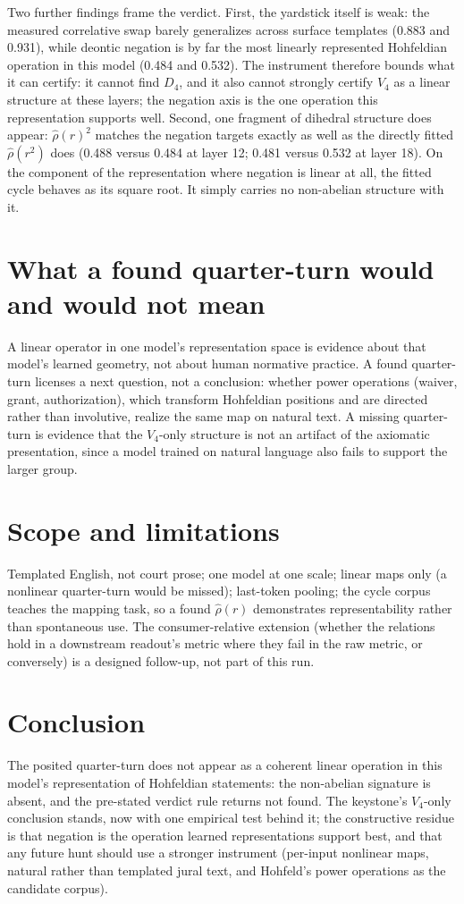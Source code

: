 \documentclass[11pt]{article}
\begin{document}
Two further findings frame the verdict. First, the yardstick itself is weak: the
measured correlative swap barely generalizes across surface templates (0.883 and 0.931),
while deontic negation is by far the most linearly represented Hohfeldian operation in
this model (0.484 and 0.532). The instrument therefore bounds what it can certify: it
cannot find $D_4$, and it also cannot strongly certify $V_4$ as a linear structure at
these layers; the negation axis is the one operation this representation supports well.
Second, one fragment of dihedral structure does appear: $\hat\rho(r)^2$ matches the
negation targets exactly as well as the directly fitted $\hat\rho(r^2)$ does (0.488
versus 0.484 at layer 12; 0.481 versus 0.532 at layer 18). On the component of the
representation where negation is linear at all, the fitted cycle behaves as its square
root. It simply carries no non-abelian structure with it.

\section{What a found quarter-turn would and would not mean}
A linear operator in one model's representation space is evidence about that model's learned
geometry, not about human normative practice. A found quarter-turn licenses a next
question, not a conclusion: whether power operations (waiver, grant, authorization), which
transform Hohfeldian positions and are directed rather than involutive, realize the same map
on natural text. A missing quarter-turn is evidence that the $V_4$-only structure is not an
artifact of the axiomatic presentation, since a model trained on natural language also fails
to support the larger group.

\section{Scope and limitations}
\label{sec:scope}
Templated English, not court prose; one model at one scale; linear maps only (a nonlinear
quarter-turn would be missed); last-token pooling; the cycle corpus teaches the mapping
task, so a found $\hat\rho(r)$ demonstrates representability rather than spontaneous use.
The consumer-relative extension (whether the relations hold in a downstream readout's
metric where they fail in the raw metric, or conversely) is a designed follow-up, not part
of this run.

\section{Conclusion}
The posited quarter-turn does not appear as a coherent linear operation in this model's
representation of Hohfeldian statements: the non-abelian signature is absent, and the
pre-stated verdict rule returns not found. The keystone's $V_4$-only conclusion stands,
now with one empirical test behind it; the constructive residue is that negation is the
operation learned representations support best, and that any future hunt should use a
stronger instrument (per-input nonlinear maps, natural rather than templated jural text,
and Hohfeld's power operations as the candidate corpus).
\end{document}
